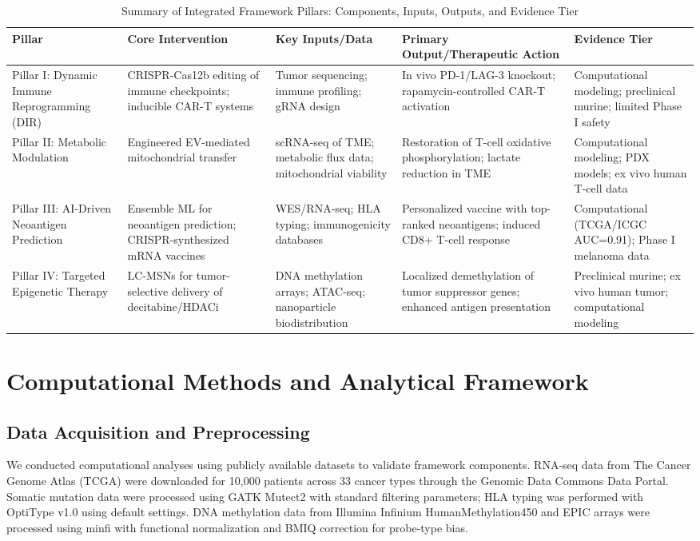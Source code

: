 \documentclass[12pt,a4paper]{article}
\begin{document}
\begin{table}[H]
\centering
\caption{Summary of Integrated Framework Pillars: Components, Inputs, Outputs, and Evidence Tier}
\label{tab:framework_summary}
\begin{tabular}{p{1.9cm} p{2.2cm} p{2.5cm} p{2.5cm} p{2.3cm}}
\toprule
\textbf{Pillar} & \textbf{Core Intervention} & \textbf{Key Inputs/Data} & \textbf{Primary Output/Therapeutic Action} & \textbf{Evidence Tier} \\
\midrule
Pillar I: Dynamic Immune Reprogramming (DIR) & CRISPR-Cas12b editing of immune checkpoints; inducible CAR-T systems & Tumor sequencing; immune profiling; gRNA design & In vivo PD-1/LAG-3 knockout; rapamycin-controlled CAR-T activation & Computational modeling; preclinical murine; limited Phase I safety \\
Pillar II: Metabolic Modulation & Engineered EV-mediated mitochondrial transfer & scRNA-seq of TME; metabolic flux data; mitochondrial viability & Restoration of T-cell oxidative phosphorylation; lactate reduction in TME & Computational modeling; PDX models; ex vivo human T-cell data \\
Pillar III: AI-Driven Neoantigen Prediction & Ensemble ML for neoantigen prediction; CRISPR-synthesized mRNA vaccines & WES/RNA-seq; HLA typing; immunogenicity databases & Personalized vaccine with top-ranked neoantigens; induced CD8+ T-cell response & Computational (TCGA/ICGC AUC=0.91); Phase I melanoma data \\
Pillar IV: Targeted Epigenetic Therapy & LC-MSNs for tumor-selective delivery of decitabine/HDACi & DNA methylation arrays; ATAC-seq; nanoparticle biodistribution & Localized demethylation of tumor suppressor genes; enhanced antigen presentation & Preclinical murine; ex vivo human tumor; computational modeling \\
\bottomrule
\end{tabular}
\end{table}

\section{Computational Methods and Analytical Framework}

\subsection{Data Acquisition and Preprocessing}

We conducted computational analyses using publicly available datasets to validate framework components. RNA-seq data from The Cancer Genome Atlas (TCGA) were downloaded for 10,000 patients across 33 cancer types through the Genomic Data Commons Data Portal. Somatic mutation data were processed using GATK Mutect2 with standard filtering parameters; HLA typing was performed with OptiType v1.0 using default settings. DNA methylation data from Illumina Infinium HumanMethylation450 and EPIC arrays were processed using minfi with functional normalization and BMIQ correction for probe-type bias.
\end{document}
